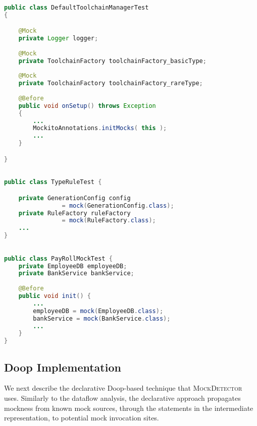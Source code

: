 \begin{lstlisting}[basicstyle=\ttfamily, caption={Example for Annotated field mocks from \texttt{DefaultToolchainManagerTest.java} in maven-core.},
basicstyle=\scriptsize\ttfamily,language = Java, framesep=4.5mm,
framexleftmargin=1mm, captionpos=b, xleftmargin=3.5ex, label=lis:annotatedMock]

public class DefaultToolchainManagerTest
{

	@Mock
	private Logger logger;
	
	@Mock
	private ToolchainFactory toolchainFactory_basicType;
	
	@Mock
	private ToolchainFactory toolchainFactory_rareType;
	
	@Before
	public void onSetup() throws Exception
	{	
		...
		MockitoAnnotations.initMocks( this );
		...
	}

}

\end{lstlisting}

\begin{lstlisting}[basicstyle=\ttfamily, caption={Example for field mocks defined in <init> from \texttt{TypeRuleTest.java} in jsonschema2pojo.},
basicstyle=\scriptsize\ttfamily,language = Java, framesep=4.5mm,
framexleftmargin=1mm, captionpos=b, xleftmargin=3.5ex, label=lis:fieldMock]

public class TypeRuleTest {

	private GenerationConfig config 
				= mock(GenerationConfig.class);
	private RuleFactory ruleFactory 
				= mock(RuleFactory.class);
	...
}

\end{lstlisting}

\begin{lstlisting}[basicstyle=\ttfamily, caption={Example for field mocks defined in Before method from \texttt{PayRollMockTest.java} in microbenchmark.},
basicstyle=\scriptsize\ttfamily,language = Java, framesep=4.5mm,
framexleftmargin=1mm, captionpos=b, xleftmargin=3.5ex, label=lis:fieldMock2]

public class PayRollMockTest {
	private EmployeeDB employeeDB;
	private BankService bankService;
	
	@Before
	public void init() {
		...
		employeeDB = mock(EmployeeDB.class);
		bankService = mock(BankService.class);
		...
	}
}

\end{lstlisting}

\subsection{Doop Implementation}
We next describe the declarative Doop-based technique that \textsc{MockDetector} uses. Similarly to the dataflow analysis, the declarative approach propagates mockness from known mock sources, through the statements in the intermediate representation, to potential mock invocation sites.

